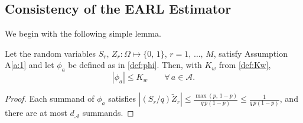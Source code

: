 \documentclass[sigconf]{acmart}
\begin{document}
\subsection{Consistency of the EARL Estimator}

We begin with the following simple lemma.
\begin{lemma}\label{lem:weight-bound}
    Let the random variables $S_r,\,Z_r\colon\Omega\mapsto\{0,\,1\}$, $r=1,\,\ldots,\,M$, satisfy Assumption A\ref{a:1} and let $\phi_a$ be defined as in \eqref{def:phi}. Then, with $K_w$ from \eqref{def:Kw},
    \begin{equation*}
        \left|\phi_a\right| \le K_w\qquad \forall\,a\in\mathcal A.
    \end{equation*}
\end{lemma}
\begin{proof}
    Each summand of $\phi_a$ satisfies $|(S_r/q)\tilde Z_r| \le \frac{\max(p,\,1-p)}{q\,p(1-p)} \le \frac{1}{q\,p(1-p)}$, and there are at most $d_{\mathcal A}$ summands.
\end{proof}
\end{document}
